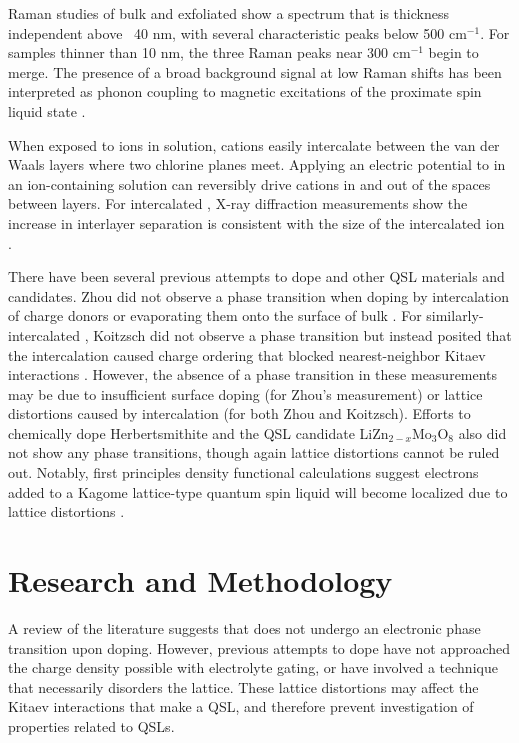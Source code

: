\documentclass[11pt]{article}
\begin{document}
Raman studies of bulk and exfoliated \rucl show a spectrum that is thickness independent above ~40 nm, with several characteristic peaks below 500 cm$^{-1}$. For samples thinner than 10 nm, the three Raman peaks near 300 cm$^{-1}$ begin to merge. The presence of a broad background signal at low Raman shifts has been interpreted as phonon coupling to magnetic excitations of the proximate spin liquid state \cite{Zhou2018,Du2019}.

When exposed to ions in solution, cations easily intercalate between the van der Waals layers where two chlorine planes meet. Applying an electric potential to \rucl in an ion-containing solution can reversibly drive cations in and out of the spaces between layers. For intercalated \rucl, X-ray diffraction measurements show the increase in interlayer separation is consistent with the size of the intercalated ion \cite{Steffen1986,Schollhorn1983}.

There have been several previous attempts to dope \rucl and other QSL materials and candidates. Zhou did not observe a phase transition when doping \rucl by intercalation of charge donors or evaporating them onto the surface of bulk \rucl \cite{Zhou2016}. For similarly-intercalated \ruclnospace , Koitzsch did not observe a phase transition but instead posited that the intercalation caused charge ordering that blocked nearest-neighbor Kitaev interactions \cite{Koitzsch2017a}. However, the absence of a phase transition in these measurements may be due to insufficient surface doping (for Zhou's measurement) or lattice distortions caused by intercalation (for both Zhou and Koitzsch). Efforts to chemically dope Herbertsmithite \cite{Kelly2016} and the QSL candidate LiZn$_{2-x}$Mo$_{3}$O$_{8}$ \cite{Sheckelton2015} also did not show any phase transitions, though again lattice distortions cannot be ruled out. Notably, first principles density functional calculations suggest electrons added to a Kagome lattice-type quantum spin liquid will become localized due to lattice distortions \cite{Liu2018}.


\section{Research and Methodology}

A review of the literature suggests that \rucl does not undergo an electronic phase transition upon doping. However, previous attempts to dope \rucl have not approached the charge density possible with electrolyte gating, or have involved a technique that necessarily disorders the lattice. These lattice distortions may affect the Kitaev interactions that make \rucl a QSL, and therefore prevent investigation of properties related to QSLs.
\end{document}

